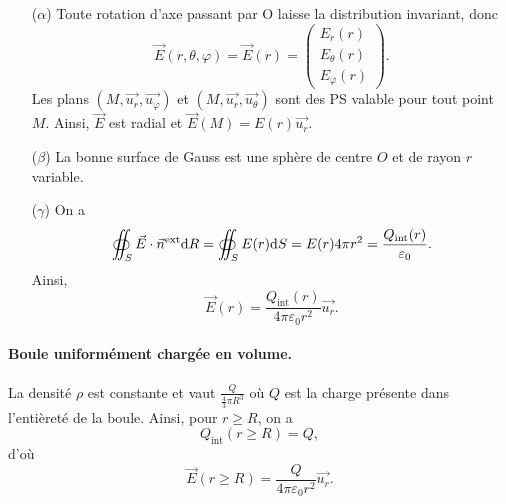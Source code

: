             \begin{itemize}
                \item [($\alpha$)] Toute rotation d'axe passant par O laisse la distribution invariant, donc 
                \begin{equation*}
                    \vec{E}(r,\theta,\varphi)=\vec{E}(r)=\begin{pmatrix}
                        E_r(r)\\ E_{\theta}(r)\\E_{\varphi}(r)
                    \end{pmatrix}.
                \end{equation*}
                Les plans $(M,\vec{u_r},\vec{u_{\varphi}})$ et $(M,\vec{u_r},\vec{u_{\theta}})$ sont des PS valable pour tout point $M$. Ainsi, $\vec{E}$ est radial et $\vec{E}(M)=E(r)\vec{u_r}$.
                \item [($\beta$)] La bonne surface de Gauss est une sphère de centre $O$ et de rayon $r$ variable.
                \item [($\gamma$)] On a 
                \begin{equation*}
                    \oiint_{S}\vec{E}\cdot\vec{n}^{\text{ext}}\mathrm{d} R=\oiint_{S}E(r)\mathrm{d} S=E(r)4\pi r^{2}=\frac{Q_{\text{int}}(r)}{\varepsilon_{0}}.
                \end{equation*}
                Ainsi,
                \begin{equation*}
                    \boxed{
                        \vec{E}(r)=\frac{Q_{\text{int}}(r)}{4\pi\varepsilon_{0}r^{2}}\vec{u_r}.
                    }
                \end{equation*}
            \end{itemize}

            \paragraph{Boule uniformément chargée en volume.}

                La densité $\rho$ est constante et vaut $\frac{Q}{\frac{4}{3}\pi R^{3}}$ où $Q$ est la charge présente dans l'entièreté de la boule. Ainsi, pour $r\geqslant R$, on a 
                \begin{equation*}
                    Q_{\text{int}}(r\geqslant R)=Q,
                \end{equation*}
                d'où
                \begin{equation*}
                    \boxed{
                        \vec{E}(r\geqslant R)=\frac{Q}{4\pi\varepsilon_0 r^{2}}\vec{u_r}.
                    }
                \end{equation*}

